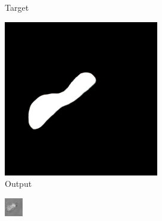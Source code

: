 \begin{figure}
\begin{subfigure}{.19\textwidth}
		\caption{Target}
	\end{subfigure}
	\begin{subfigure}{.19\textwidth}
		\centering
		\includegraphics[width=.9\linewidth]{img/results/b64_output}
		\caption{Output}
	\end{subfigure}
	\begin{subfigure}{.19\textwidth}
		\centering
		\includegraphics[width=.9\linewidth,interpolate=false]{img/results/b64_real}

\end{subfigure}
\end{figure}
